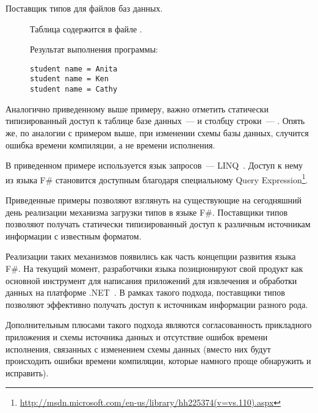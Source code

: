 \begin{description}
\clearpage

\item[Поставщик типов для файлов баз данных.] Таблица  содержится в файле .
\begin{code}

\end{code}

Результат выполнения программы:
\begin{lstlisting}[caption={Результат выполнения программы \ref{dbml-type-provider}.}, label=dbml-result]
student name = Anita
student name = Ken
student name = Cathy
\end{lstlisting}

\end{description}

Аналогично приведенному выше примеру, важно отметить статически типизированный доступ к таблице базе данных~---  и столбцу строки~--- . Опять же, по аналогии с примером выше, при изменении схемы базы данных, случится ошибка времени компиляции, а не времени исполнения.

В приведенном примере используется язык запросов~--- LINQ~\cite{linq}.
Доступ к нему из языка F\# становится доступным благодаря специальному Query Expression\footnote{\url{http://msdn.microsoft.com/en-us/library/hh225374(v=vs.110).aspx}}.

Приведенные примеры позволяют взглянуть на существующие на сегодняшний день реализации механизма загрузки типов в языке F\#.
Поставщики типов позволяют получать статически типизированный доступ к различным источникам информации с известным форматом.

Реализации таких механизмов появились как часть концепции развития языка F\#.
На текущий момент, разработчики языка позиционируют свой продукт как основной инструмент для написания приложений для извлечения и обработки данных на платформе .NET~\cite{duffy2008}.
В рамках такого подхода, поставщики типов позволяют эффективно получать доступ к источникам информации разного рода.

Дополнительным плюсами такого подхода являются согласованность прикладного приложения и схемы источника данных и отсутствие ошибок времени исполнения, связанных с изменением схемы данных (вместо них будут происходить ошибки времени компиляции, которые намного проще обнаружить и исправить).